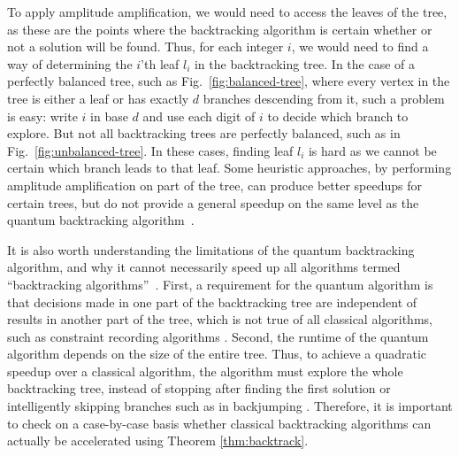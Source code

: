 To apply amplitude amplification, we would need to access the leaves of the tree, as these are the points where the backtracking algorithm is certain whether or not a solution will be found. Thus, for each integer $i$, we would need to find a way of determining the $i$'th leaf $l_i$ in the backtracking tree. In the case of a perfectly balanced tree, such as Fig.\ \ref{fig:balanced-tree}, where every vertex in the tree is either a leaf or has exactly $d$ branches descending from it, such a problem is easy: write $i$ in base $d$ and use each digit of $i$ to decide which branch to explore. But not all backtracking trees are perfectly balanced, such as in Fig.\ \ref{fig:unbalanced-tree}. In these cases, finding leaf $l_i$ is hard as we cannot be certain which branch leads to that leaf. Some heuristic approaches, by performing amplitude amplification on part of the tree, can produce better speedups for certain trees, but do not provide a general speedup on the same level as the quantum backtracking algorithm~\cite{montanaro2015}.

It is also worth understanding the limitations of the quantum backtracking algorithm, and why it cannot necessarily speed up all algorithms termed ``backtracking algorithms''~\cite{montanaro2015}. First, a requirement for the quantum algorithm is that decisions made in one part of the backtracking tree are independent of results in another part of the tree, which is not true of all classical algorithms, such as constraint recording algorithms \cite{dechter1990}. Second, the runtime of the quantum algorithm depends on the size of the entire tree. Thus, to achieve a quadratic speedup over a classical algorithm, the algorithm must explore the whole backtracking tree, instead of stopping after finding the first solution or intelligently skipping branches such as in backjumping \cite{dechter1990}. Therefore, it is important to check on a case-by-case basis whether classical backtracking algorithms can actually be accelerated using Theorem \ref{thm:backtrack}.

